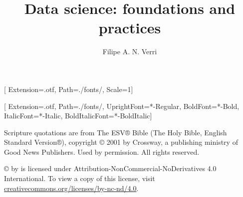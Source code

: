 \documentclass[twoside,a5paper]{memoir}
\begin{document}
[
  Extension={.otf},
  Path={./fonts/},
  Scale=1]

\setmainfont{STIXTwoText}[
  Extension={.otf},
  Path={./fonts/},
  UprightFont={*-Regular},
  BoldFont={*-Bold},
  ItalicFont={*-Italic},
  BoldItalicFont={*-BoldItalic}]

\title{Data science: foundations and practices}
\author{Filipe A. N. Verri}

\maketitle
\thispagestyle{empty}
\clearpage

\newpage
\mbox{}
\vfill

\footnotesize

Scripture quotations are from The ESV® Bible (The Holy Bible, English Standard Version®),
copyright © 2001 by Crossway, a publishing ministry of Good News Publishers. Used by
permission. All rights reserved.

\vspace{0.5cm}
\thetitle{} © \the\year{} by \theauthor{} is licensed under
Attribution-NonCommercial-NoDerivatives 4.0 International. To view a copy of this license,
visit
\href{http://creativecommons.org/licenses/by-nc-nd/4.0/}{creativecommons.org/licenses/by-nc-nd/4.0}.

\thispagestyle{empty}
\newpage

\tableofcontents
\thispagestyle{empty}









\printbibliography
\end{document}
